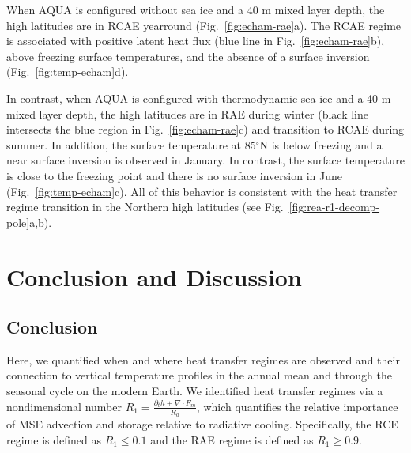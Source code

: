 \documentclass{ametsocV5}
\begin{document}
  
  When AQUA is configured without sea ice and a 40 m mixed layer depth, the high latitudes are in RCAE yearround (Fig.~\ref{fig:echam-rae}a). The RCAE regime is associated with positive latent heat flux (blue line in Fig.~\ref{fig:echam-rae}b), above freezing surface temperatures, and the absence of a surface inversion (Fig.~\ref{fig:temp-echam}d). 

  In contrast, when AQUA is configured with thermodynamic sea ice and a 40 m mixed layer depth, the high latitudes are in RAE during winter (black line intersects the blue region in Fig.~\ref{fig:echam-rae}c) and transition to RCAE during summer. In addition, the surface temperature at 85$^\circ$N is below freezing and a near surface inversion is observed in January. In contrast, the surface temperature is close to the freezing point and there is no surface inversion in June (Fig.~\ref{fig:temp-echam}c). All of this behavior is consistent with the heat transfer regime transition in the Northern high latitudes (see Fig.~\ref{fig:rea-r1-decomp-pole}a,b). %


\section{Conclusion and Discussion}

\subsection{Conclusion}

Here, we quantified when and where heat transfer regimes are observed and their connection to vertical temperature profiles in the annual mean and through the seasonal cycle on the modern Earth. We identified heat transfer regimes via a nondimensional number $R_1=\frac{\partial_t h + \nabla\cdot F_m}{R_a}$, which quantifies the relative importance of MSE advection and storage relative to radiative cooling. Specifically, the RCE regime is defined as $R_1 \le 0.1$ and the RAE regime is defined as $R_1 \ge 0.9$.
\end{document}
